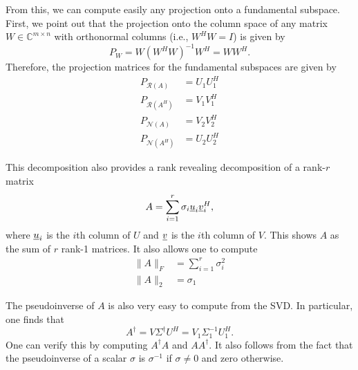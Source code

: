 From this, we can compute easily any projection onto a fundamental subspace.
First, we point out that the projection onto the column space of any matrix $W\in \mathbb{C}^{m \times n}$ with orthonormal columns (i.e., $W^H W = I$) is given by
\[ P_W = W (W^H W)^{-1} W^H = W W^H. \]
Therefore, the projection matrices for the fundamental subspaces are given by
\begin{align*}
P_{\mathcal{R}(A)} &= U_1 U_1^H \\
P_{\mathcal{R}(A^H)} &= V_1 V_1^H \\
P_{\mathcal{N}(A)} &= V_2 V_2^H \\
P_{\mathcal{N}(A^H)} &= U_2 U_2^H
\end{align*}

This decomposition also provides a rank revealing decomposition of a rank-$r$ matrix
\[ A = \sum_{i=1}^r \sigma_i \underline{u}_i \underline{v}_i^H, \]
where $\underline{u}_i$ is the $i$th column of $U$ and $\underline{v}$ is the $i$th column of $V$.
This shows $A$ as the sum of $r$ rank-1 matrices.
It also allows one to compute
\begin{align*}
\| A \|_F &= \sum_{i=1}^r \sigma_i^2 \\
\| A \|_2 &= \sigma_1
\end{align*}

The pseudoinverse of $A$ is also very easy to compute from the SVD.
In particular, one finds that
\[ A^\dagger = V \Sigma^\dagger U^H = V_1 \Sigma_1^{-1} U_1^H. \]
One can verify this by computing $A^\dagger A$ and $A A^\dagger$.
It also follows from the fact that the pseudoinverse of a scalar $\sigma$ is $\sigma^{-1}$ if $\sigma \neq 0$ and zero otherwise.



